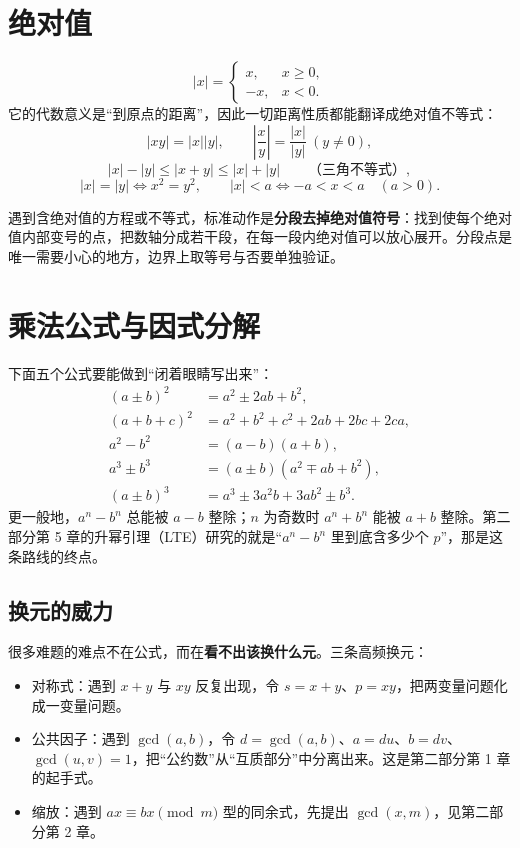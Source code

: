 \section{绝对值}
\[
|x|=\begin{cases}x,&x\ge0,\\-x,&x<0.\end{cases}
\]
它的代数意义是“到原点的距离”，因此一切距离性质都能翻译成绝对值不等式：
\[
|xy|=|x||y|,\qquad \left|\frac xy\right|=\frac{|x|}{|y|}\ (y\ne0),
\]
\[
|x|-|y|\le |x+y|\le |x|+|y|\qquad\text{（三角不等式）},
\]
\[
|x|=|y|\iff x^2=y^2,\qquad |x|<a\iff -a<x<a\quad(a>0).
\]
\begin{tip}[绝对值问题的标准动作]
遇到含绝对值的方程或不等式，标准动作是\textbf{分段去掉绝对值符号}：找到使每个绝对值内部变号的点，把数轴分成若干段，在每一段内绝对值可以放心展开。分段点是唯一需要小心的地方，边界上取等号与否要单独验证。
\end{tip}

\section{乘法公式与因式分解}
下面五个公式要能做到“闭着眼睛写出来”：
\begin{align}
(a\pm b)^2&=a^2\pm2ab+b^2,\\
(a+b+c)^2&=a^2+b^2+c^2+2ab+2bc+2ca,\\
a^2-b^2&=(a-b)(a+b),\\
a^3\pm b^3&=(a\pm b)(a^2\mp ab+b^2),\\
(a\pm b)^3&=a^3\pm3a^2b+3ab^2\pm b^3.
\end{align}
更一般地，$a^n-b^n$ 总能被 $a-b$ 整除；$n$ 为奇数时 $a^n+b^n$ 能被 $a+b$ 整除。第二部分第 5 章的升幂引理（LTE）研究的就是“$a^n-b^n$ 里到底含多少个 $p$”，那是这条路线的终点。

\subsection{换元的威力}
很多难题的难点不在公式，而在\textbf{看不出该换什么元}。三条高频换元：
\begin{itemize}
\item 对称式：遇到 $x+y$ 与 $xy$ 反复出现，令 $s=x+y$、$p=xy$，把两变量问题化成一变量问题。
\item 公共因子：遇到 $\gcd(a,b)$，令 $d=\gcd(a,b)$、$a=du$、$b=dv$、$\gcd(u,v)=1$，把“公约数”从“互质部分”中分离出来。这是第二部分第 1 章的起手式。
\item 缩放：遇到 $ax\equiv bx\pmod m$ 型的同余式，先提出 $\gcd(x,m)$，见第二部分第 2 章。
\end{itemize}

